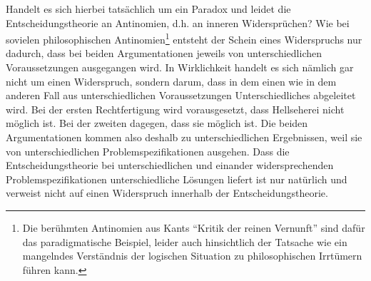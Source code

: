 Handelt es sich hierbei tatsächlich um ein Paradox und leidet die
Entscheidungstheorie an Antinomien, d.h. an inneren Widersprüchen? Wie bei
sovielen philosophischen Antinomien\footnote{Die berühmten Antinomien aus Kants
"`Kritik der reinen Vernunft"' sind dafür das paradigmatische Beispiel, leider
auch hinsichtlich der Tatsache wie ein mangelndes Verständnis der logischen
Situation zu philosophischen Irrtümern führen kann.} entsteht der Schein eines
Widerspruchs nur dadurch, dass bei beiden Argumentationen jeweils von 
unterschiedlichen Voraussetzungen ausgegangen wird. In Wirklichkeit handelt es
sich nämlich gar nicht um einen Widerspruch, sondern darum, dass in dem einen
wie in dem anderen Fall aus unterschiedlichen Voraussetzungen Unterschiedliches
abgeleitet wird. Bei der ersten Rechtfertigung wird vorausgesetzt, dass
Hellseherei nicht möglich ist. Bei der zweiten dagegen, dass sie möglich ist.
Die beiden Argumentationen kommen also deshalb zu unterschiedlichen
Ergebnissen, weil sie von unterschiedlichen Problemspezifikationen ausgehen.
Dass die Entscheidungstheorie bei unterschiedlichen und einander
widersprechenden Problemspezifikationen unterschiedliche Lösungen liefert 
ist nur natürlich und
verweist nicht auf einen Widerspruch innerhalb der Entscheidungstheorie.

